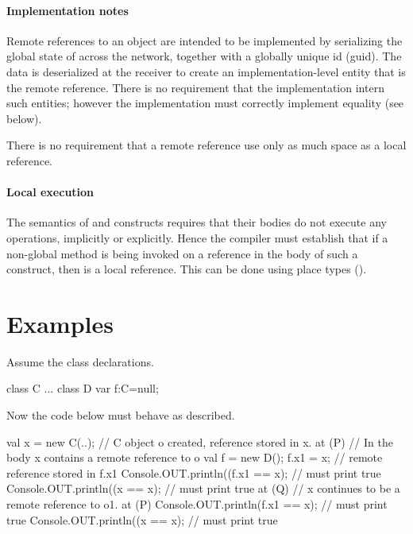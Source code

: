 \paragraph{Implementation notes}
Remote references to an object  are intended to be implemented
by serializing the global state of  across the network,
together with a globally unique id (guid). The data is deserialized at
the receiver to create an implementation-level entity that is the
remote reference. There is no requirement that the implementation
intern such entities; however the implementation must correctly
implement equality (see below).

There is no requirement that a remote reference use only as much space as a local reference.

  
\paragraph{Local execution}


 The semantics of  and  constructs requires that their
 bodies do not execute any  operations, implicitly or
 explicitly. Hence the compiler must establish that if a non-global method
 is being invoked on a reference  in the body of such a construct,
 then  is a local reference. This can be done using place types ().

  
\section{Examples}

Assume the class declarations. 

 \begin{x10}
class C { ...} 
class D {
   var f:C=null;
}
\end{x10}
 
Now the code below must behave as described.
\begin{x10}
val x = new C(..); // C object o created, reference stored in x. 
at (P) { // In the body x contains a remote reference to o
      val f = new D();
      f.x1  = x; // remote reference stored in f.x1
      Console.OUT.println((f.x1 == x);               // must print true
      Console.OUT.println((x == x);                  // must print true
      at (Q) { // x continues to be a remote reference to o1.
         at (P) {  
             Console.OUT.println(f.x1 == x);   // must print true
             Console.OUT.println((x == x);   // must print true
         }
      }
}
\end{x10}
  

